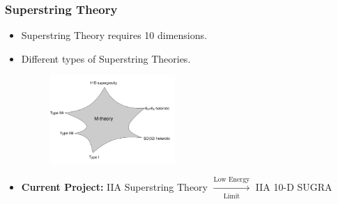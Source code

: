 \documentclass[t]{beamer}
\begin{document}
\begin{frame}
\frametitle{Superstring Theory}

\begin{itemize}
\setlength{\parskip}{10pt}
\item<1-> Superstring Theory requires 10 dimensions.

\item<2-> Different types of Superstring Theories.
\begin{figure}[htb]
\includegraphics[width=0.45\textwidth]{Mtheory}
\end{figure}

\item<3-> \textbf{Current Project:} IIA Superstring Theory $\xrightarrow[\text{Limit}]{\text{Low Energy}}$ IIA 10-D SUGRA

\end{itemize}
\end{frame}

\end{document}
